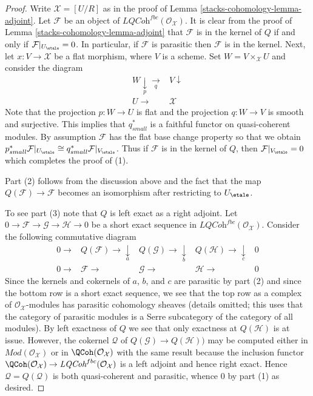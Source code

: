 \begin{proof}
Write $\mathcal{X} = [U/R]$ as in the proof of Lemma \ref{stacks-cohomology-lemma-adjoint}.
Let $\mathcal{F}$ be an object of
$\textit{LQCoh}^{fbc}(\mathcal{O}_\mathcal{X})$.
It is clear from the proof of Lemma \ref{stacks-cohomology-lemma-adjoint}
that $\mathcal{F}$ is in the kernel of $Q$ if and only if
$\mathcal{F}|_{U_\etale} = 0$.
In particular, if $\mathcal{F}$ is parasitic then $\mathcal{F}$ is in
the kernel. Next, let $x : V \to \mathcal{X}$ be a flat morphism, where
$V$ is a scheme. Set $W = V \times_\mathcal{X} U$ and consider the diagram
$$
\begin{array}{cc}W \underset{p}{\downarrow}\underset{q}{\longrightarrow} & V \downarrow \\ U \longrightarrow & \mathcal{X}\end{array}
$$
Note that the projection $p : W \to U$ is flat and the projection
$q : W \to V$ is smooth and surjective. This implies that $q_{small}^*$
is a faithful functor on quasi-coherent modules. By assumption $\mathcal{F}$
has the flat base change property so that we obtain
$p_{small}^*\mathcal{F}|_{U_\etale} \cong
q_{small}^*\mathcal{F}|_{V_\etale}$. Thus if $\mathcal{F}$
is in the kernel of $Q$, then $\mathcal{F}|_{V_\etale} = 0$
which completes the proof of (1).

\medskip\noindent
Part (2) follows from the discussion above and the fact
that the map $Q(\mathcal{F}) \to \mathcal{F}$ becomes an isomorphism after
restricting to $U_\etale$.

\medskip\noindent
To see part (3) note that $Q$ is left exact as a right adjoint.
Let $0 \to \mathcal{F} \to \mathcal{G} \to \mathcal{H} \to 0$
be a short exact sequence in $\textit{LQCoh}^{fbc}(\mathcal{O}_\mathcal{X})$.
Consider the following commutative diagram
$$
\begin{array}{ccccc}0 \longrightarrow & Q(\mathcal{F}) \longrightarrow\underset{a}{\downarrow} & Q(\mathcal{G}) \longrightarrow\underset{b}{\downarrow} & Q(\mathcal{H}) \longrightarrow\underset{c}{\downarrow} & 0 \\ 0 \longrightarrow & \mathcal{F} \longrightarrow & \mathcal{G} \longrightarrow & \mathcal{H} \longrightarrow & 0\end{array}
$$
Since the kernels and cokernels of $a$, $b$, and $c$ are parasitic by
part (2) and since the bottom row is a short exact sequence, we see that
the top row as a complex of $\mathcal{O}_\mathcal{X}$-modules has parasitic
cohomology sheaves (details omitted; this uses that the category of
parasitic modules is a Serre subcategory of the category of all modules).
By left exactness of $Q$ we see that only exactness at $Q(\mathcal{H})$
is at issue. However, the cokernel $\mathcal{Q}$ of
$Q(\mathcal{G}) \to Q(\mathcal{H}))$
may be computed either in $\textit{Mod}(\mathcal{O}_\mathcal{X})$
or in $\QCoh(\mathcal{O}_\mathcal{X})$ with the same result because
the inclusion functor $\QCoh(\mathcal{O}_\mathcal{X}) \to
\textit{LQCoh}^{fbc}(\mathcal{O}_\mathcal{X})$
is a left adjoint and hence right exact. Hence $\mathcal{Q} = Q(\mathcal{Q})$
is both quasi-coherent and parasitic, whence $0$ by part (1) as desired.


\end{proof}
